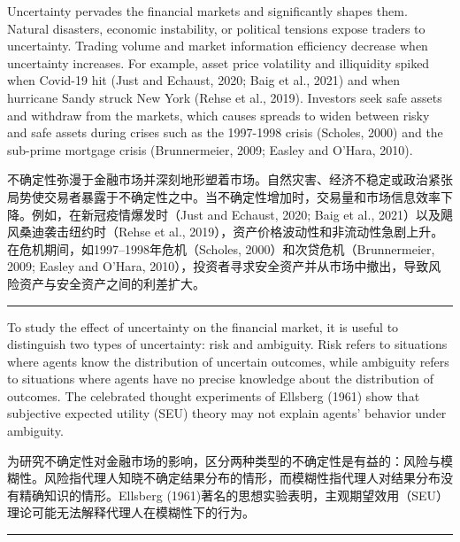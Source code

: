 \documentclass[12pt,a4paper]{article}
\newenvironment{original}{%
  \par\vspace{4pt}\noindent%
  \color{black}%
  \ignorespaces
}{%
  \par\vspace{2pt}%
}
\newenvironment{translation}{%
  \par\vspace{2pt}\noindent%
  \color{transblue}%
  \ignorespaces
}{%
  \par\vspace{4pt}\hrule\vspace{6pt}%
}
\begin{document}
\begin{original}
Uncertainty pervades the financial markets and significantly shapes them. Natural disasters, economic instability, or political tensions expose traders to uncertainty. Trading volume and market information efficiency decrease when uncertainty increases. For example, asset price volatility and illiquidity spiked when Covid-19 hit (Just and Echaust, 2020; Baig et al., 2021) and when hurricane Sandy struck New York (Rehse et al., 2019). Investors seek safe assets and withdraw from the markets, which causes spreads to widen between risky and safe assets during crises such as the 1997-1998 crisis (Scholes, 2000) and the sub-prime mortgage crisis (Brunnermeier, 2009; Easley and O'Hara, 2010).
\end{original}
\begin{translation}
不确定性弥漫于金融市场并深刻地形塑着市场。自然灾害、经济不稳定或政治紧张局势使交易者暴露于不确定性之中。当不确定性增加时，交易量和市场信息效率下降。例如，在新冠疫情爆发时（Just and Echaust, 2020; Baig et al., 2021）以及飓风桑迪袭击纽约时（Rehse et al., 2019），资产价格波动性和非流动性急剧上升。在危机期间，如1997--1998年危机（Scholes, 2000）和次贷危机（Brunnermeier, 2009; Easley and O'Hara, 2010），投资者寻求安全资产并从市场中撤出，导致风险资产与安全资产之间的利差扩大。
\end{translation}

\begin{original}
To study the effect of uncertainty on the financial market, it is useful to distinguish two types of uncertainty: risk and ambiguity. Risk refers to situations where agents know the distribution of uncertain outcomes, while ambiguity refers to situations where agents have no precise knowledge about the distribution of outcomes. The celebrated thought experiments of Ellsberg (1961) show that subjective expected utility (SEU) theory may not explain agents' behavior under ambiguity.
\end{original}
\begin{translation}
为研究不确定性对金融市场的影响，区分两种类型的不确定性是有益的：风险与模糊性。风险指代理人知晓不确定结果分布的情形，而模糊性指代理人对结果分布没有精确知识的情形。Ellsberg (1961)著名的思想实验表明，主观期望效用（SEU）理论可能无法解释代理人在模糊性下的行为。
\end{translation}
\end{document}
